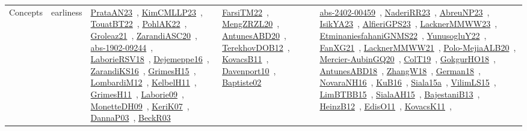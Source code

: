 {\begin{longtable}{lp{3cm}>{\raggedright\arraybackslash}p{6cm}>{\raggedright\arraybackslash}p{6cm}>{\raggedright\arraybackslash}p{8cm}}
Concepts & earliness & \href{works/PrataAN23.pdf}{PrataAN23}~\cite{PrataAN23}, \href{works/KimCMLLP23.pdf}{KimCMLLP23}~\cite{KimCMLLP23}, \href{works/TouatBT22.pdf}{TouatBT22}~\cite{TouatBT22}, \href{works/PohlAK22.pdf}{PohlAK22}~\cite{PohlAK22}, \href{works/Groleaz21.pdf}{Groleaz21}~\cite{Groleaz21}, \href{works/ZarandiASC20.pdf}{ZarandiASC20}~\cite{ZarandiASC20}, \href{works/abs-1902-09244.pdf}{abs-1902-09244}~\cite{abs-1902-09244}, \href{works/LaborieRSV18.pdf}{LaborieRSV18}~\cite{LaborieRSV18}, \href{works/Dejemeppe16.pdf}{Dejemeppe16}~\cite{Dejemeppe16}, \href{works/ZarandiKS16.pdf}{ZarandiKS16}~\cite{ZarandiKS16}, \href{works/GrimesH15.pdf}{GrimesH15}~\cite{GrimesH15}, \href{works/LombardiM12.pdf}{LombardiM12}~\cite{LombardiM12}, \href{works/KelbelH11.pdf}{KelbelH11}~\cite{KelbelH11}, \href{works/GrimesH11.pdf}{GrimesH11}~\cite{GrimesH11}, \href{works/Laborie09.pdf}{Laborie09}~\cite{Laborie09}, \href{works/MonetteDH09.pdf}{MonetteDH09}~\cite{MonetteDH09}, \href{works/KeriK07.pdf}{KeriK07}~\cite{KeriK07}, \href{works/DannaP03.pdf}{DannaP03}~\cite{DannaP03}, \href{works/BeckR03.pdf}{BeckR03}~\cite{BeckR03} & \href{works/FarsiTM22.pdf}{FarsiTM22}~\cite{FarsiTM22}, \href{works/MengZRZL20.pdf}{MengZRZL20}~\cite{MengZRZL20}, \href{works/AntunesABD20.pdf}{AntunesABD20}~\cite{AntunesABD20}, \href{works/TerekhovDOB12.pdf}{TerekhovDOB12}~\cite{TerekhovDOB12}, \href{works/KovacsB11.pdf}{KovacsB11}~\cite{KovacsB11}, \href{works/Davenport10.pdf}{Davenport10}~\cite{Davenport10}, \href{works/Baptiste02.pdf}{Baptiste02}~\cite{Baptiste02} & \href{works/abs-2402-00459.pdf}{abs-2402-00459}~\cite{abs-2402-00459}, \href{works/NaderiRR23.pdf}{NaderiRR23}~\cite{NaderiRR23}, \href{works/AbreuNP23.pdf}{AbreuNP23}~\cite{AbreuNP23}, \href{works/IsikYA23.pdf}{IsikYA23}~\cite{IsikYA23}, \href{works/AlfieriGPS23.pdf}{AlfieriGPS23}~\cite{AlfieriGPS23}, \href{works/LacknerMMWW23.pdf}{LacknerMMWW23}~\cite{LacknerMMWW23}, \href{works/EtminaniesfahaniGNMS22.pdf}{EtminaniesfahaniGNMS22}~\cite{EtminaniesfahaniGNMS22}, \href{works/YunusogluY22.pdf}{YunusogluY22}~\cite{YunusogluY22}, \href{works/FanXG21.pdf}{FanXG21}~\cite{FanXG21}, \href{works/LacknerMMWW21.pdf}{LacknerMMWW21}~\cite{LacknerMMWW21}, \href{works/Polo-MejiaALB20.pdf}{Polo-MejiaALB20}~\cite{Polo-MejiaALB20}, \href{works/Mercier-AubinGQ20.pdf}{Mercier-AubinGQ20}~\cite{Mercier-AubinGQ20}, \href{works/ColT19.pdf}{ColT19}~\cite{ColT19}, \href{works/GokgurHO18.pdf}{GokgurHO18}~\cite{GokgurHO18}, \href{works/AntunesABD18.pdf}{AntunesABD18}~\cite{AntunesABD18}, \href{works/ZhangW18.pdf}{ZhangW18}~\cite{ZhangW18}, \href{works/German18.pdf}{German18}~\cite{German18}, \href{works/NovaraNH16.pdf}{NovaraNH16}~\cite{NovaraNH16}, \href{works/KuB16.pdf}{KuB16}~\cite{KuB16}, \href{works/Siala15a.pdf}{Siala15a}~\cite{Siala15a}, \href{works/VilimLS15.pdf}{VilimLS15}~\cite{VilimLS15}, \href{works/LimBTBB15.pdf}{LimBTBB15}~\cite{LimBTBB15}, \href{works/SialaAH15.pdf}{SialaAH15}~\cite{SialaAH15}, \href{works/BajestaniB13.pdf}{BajestaniB13}~\cite{BajestaniB13}, \href{works/HeinzB12.pdf}{HeinzB12}~\cite{HeinzB12}, \href{works/EdisO11.pdf}{EdisO11}~\cite{EdisO11}, \href{works/KovacsK11.pdf}{KovacsK11}~\cite{KovacsK11}, 
\end{longtable}}
